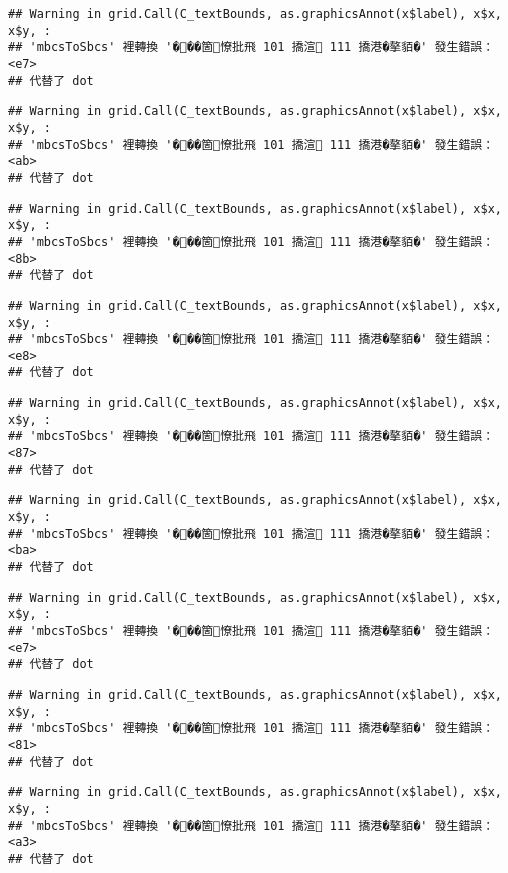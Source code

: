 \documentclass[
]{article}
\begin{document}
\begin{verbatim}
## Warning in grid.Call(C_textBounds, as.graphicsAnnot(x$label), x$x, x$y, :
## 'mbcsToSbcs' 裡轉換 '���箇憭批飛 101 撟渲 111 撟港�摮貊�' 發生錯誤：<e7>
## 代替了 dot
\end{verbatim}

\begin{verbatim}
## Warning in grid.Call(C_textBounds, as.graphicsAnnot(x$label), x$x, x$y, :
## 'mbcsToSbcs' 裡轉換 '���箇憭批飛 101 撟渲 111 撟港�摮貊�' 發生錯誤：<ab>
## 代替了 dot
\end{verbatim}

\begin{verbatim}
## Warning in grid.Call(C_textBounds, as.graphicsAnnot(x$label), x$x, x$y, :
## 'mbcsToSbcs' 裡轉換 '���箇憭批飛 101 撟渲 111 撟港�摮貊�' 發生錯誤：<8b>
## 代替了 dot
\end{verbatim}

\begin{verbatim}
## Warning in grid.Call(C_textBounds, as.graphicsAnnot(x$label), x$x, x$y, :
## 'mbcsToSbcs' 裡轉換 '���箇憭批飛 101 撟渲 111 撟港�摮貊�' 發生錯誤：<e8>
## 代替了 dot
\end{verbatim}

\begin{verbatim}
## Warning in grid.Call(C_textBounds, as.graphicsAnnot(x$label), x$x, x$y, :
## 'mbcsToSbcs' 裡轉換 '���箇憭批飛 101 撟渲 111 撟港�摮貊�' 發生錯誤：<87>
## 代替了 dot
\end{verbatim}

\begin{verbatim}
## Warning in grid.Call(C_textBounds, as.graphicsAnnot(x$label), x$x, x$y, :
## 'mbcsToSbcs' 裡轉換 '���箇憭批飛 101 撟渲 111 撟港�摮貊�' 發生錯誤：<ba>
## 代替了 dot
\end{verbatim}

\begin{verbatim}
## Warning in grid.Call(C_textBounds, as.graphicsAnnot(x$label), x$x, x$y, :
## 'mbcsToSbcs' 裡轉換 '���箇憭批飛 101 撟渲 111 撟港�摮貊�' 發生錯誤：<e7>
## 代替了 dot
\end{verbatim}

\begin{verbatim}
## Warning in grid.Call(C_textBounds, as.graphicsAnnot(x$label), x$x, x$y, :
## 'mbcsToSbcs' 裡轉換 '���箇憭批飛 101 撟渲 111 撟港�摮貊�' 發生錯誤：<81>
## 代替了 dot
\end{verbatim}

\begin{verbatim}
## Warning in grid.Call(C_textBounds, as.graphicsAnnot(x$label), x$x, x$y, :
## 'mbcsToSbcs' 裡轉換 '���箇憭批飛 101 撟渲 111 撟港�摮貊�' 發生錯誤：<a3>
## 代替了 dot
\end{verbatim}
\end{document}
